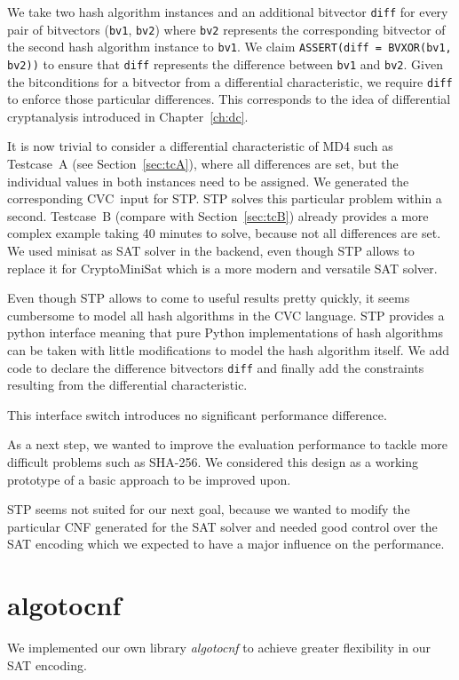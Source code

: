We take two hash algorithm instances and an additional bitvector \texttt{diff}
for every pair of bitvectors (\texttt{bv1}, \texttt{bv2}) where \texttt{bv2} represents
the corresponding bitvector of the second hash algorithm instance to \texttt{bv1}.
We claim \texttt{ASSERT(diff = BVXOR(bv1, bv2))} to ensure that \texttt{diff}
represents the difference between \texttt{bv1} and \texttt{bv2}. Given the bitconditions
for a bitvector from a differential characteristic, we require \texttt{diff} to enforce
those particular differences. This corresponds to the idea of differential cryptanalysis
introduced in Chapter~\ref{ch:dc}.

It is now trivial to consider a differential characteristic of MD4 such as Testcase~A (see
Section~\ref{sec:tcA}), where all differences are set, but the individual values in both
instances need to be assigned. We generated the corresponding CVC~input for STP.
STP solves this particular problem within a second. Testcase~B (compare with
Section~\ref{sec:tcB}) already provides a more complex example taking
40 minutes to solve, because not all differences are set.
We used minisat as SAT solver in the backend, even though STP
allows to replace it for CryptoMiniSat which is a more modern and versatile SAT solver.

Even though STP allows to come to useful results pretty quickly,
it seems cumbersome to model all hash algorithms in the CVC language.
STP provides a python interface meaning that pure Python implementations
of hash algorithms can be taken with little modifications to model the
hash algorithm itself. We add code to declare the difference bitvectors
\texttt{diff} and finally add the constraints resulting from the differential
characteristic.

This interface switch introduces no significant performance difference.

As a next step, we wanted to improve the evaluation performance to tackle more difficult
problems such as SHA-256. We considered this design as a working prototype of a basic approach to be
improved upon.

STP seems not suited for our next goal, because we wanted to modify
the particular CNF generated for the SAT solver and needed good control
over the SAT encoding which we expected to have a major influence
on the performance.

\section{algotocnf}
\label{sec:enc-algotocnf}
%
We implemented our own library \emph{algotocnf} to achieve greater
flexibility in our SAT encoding.

